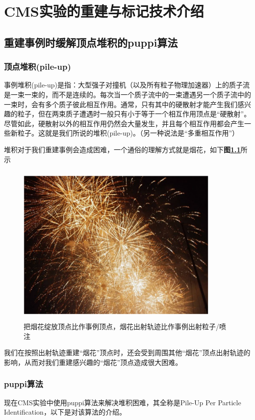 \chapter{CMS实验的重建与标记技术介绍}
\label{chap3}
\fontsize{12bp}{14.4pt}
\section{重建事例时缓解顶点堆积的puppi算法}
\subsection{顶点堆积(pile-up)}
事例堆积(pile-up)是指：大型强子对撞机（以及所有粒子物理加速器）上的质子流是一束一束的，而不是连续的。每次当一个质子流中的一束遭遇另一个质子流中的一束时，会有多个质子彼此相互作用。通常，只有其中的硬散射才能产生我们感兴趣的粒子，但在两束质子遭遇时一般只有小于等于一个相互作用顶点是“硬散射”。尽管如此，硬散射以外的相互作用仍然会大量发生，并且每个相互作用都会产生一些新粒子。这就是我们所说的堆积(pile-up)。（另一种说法是“多重相互作用”）

堆积对于我们重建事例会造成困难，一个通俗的理解方式就是烟花，如下\textbf{图\ref{fig:3.1}}所示
\begin{figure}[H]
 \centering
 \includegraphics[height=8cm, width=10cm]{pictures/firework.png}
 \caption{把烟花绽放顶点比作事例顶点，烟花出射轨迹比作事例出射粒子/喷注}
 \label{fig:3.1}
\end{figure}
我们在按照出射轨迹重建“烟花”顶点时，还会受到周围其他“烟花”顶点出射轨迹的影响，从而对我们重建感兴趣的“烟花”顶点造成很大困难。

\subsection{puppi算法}
现在CMS实验中使用puppi算法来解决堆积困难，其全称是Pile-Up Per Particle Identification\cite{Pileup_Per_Particle_Identification}，以下是对该算法的介绍。

